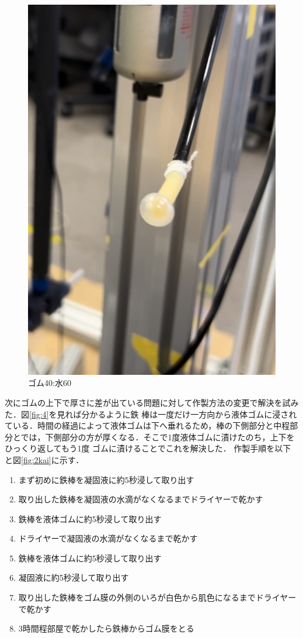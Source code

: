 \begin{figure}[h]
\begin{minipage}{0.49\hsize}
      \includegraphics[scale=0.25]{pic/zu5.jpg}
      \caption{ゴム40:水60}
      \label{fig:40}
  \end{minipage} 
\end{figure}
\newpage
次にゴムの上下で厚さに差が出ている問題に対して作製方法の変更で解決を試みた．図\ref{fig:4}を見れば分かるように鉄
棒は一度だけ一方向から液体ゴムに浸されている．時間の経過によって液体ゴムは下へ垂れるため，棒の下側部分と中程部分とでは，下側部分の方が厚くなる．そこで1度液体ゴムに漬けたのち，上下をひっくり返してもう1度
ゴムに漬けることでこれを解決した．
作製手順を以下と図\ref{fig:2kai}に示す．
\begin{enumerate}
  \item まず初めに鉄棒を凝固液に約5秒浸して取り出す
  \item 取り出した鉄棒を凝固液の水滴がなくなるまでドライヤーで乾かす
  \item 鉄棒を液体ゴムに約5秒浸して取り出す
  \item ドライヤーで凝固液の水滴がなくなるまで乾かす
  \item 鉄棒を液体ゴムに約5秒浸して取り出す
  \item 凝固液に約5秒浸して取り出す
  \item 取り出した鉄棒をゴム膜の外側のいろが白色から肌色になるまでドライヤーで乾かす
  \item 3時間程部屋で乾かしたら鉄棒からゴム膜をとる
\end{enumerate}
